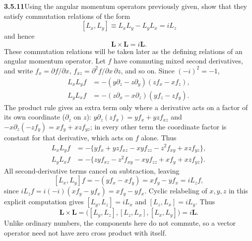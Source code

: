 \par\bigskip
\noindent\textbf{3.5.11}\quad Using the angular momentum operators previously
given, show that they satisfy commutation relations of the form
\[
[L_{x},L_{y}]\equiv L_{x}L_{y}-L_{y}L_{x}=iL_{z}
\]
and hence
\[
\mathbf{L}\times\mathbf{L}=i\mathbf{L}.
\]
These commutation relations will be taken later as the defining relations of
an angular momentum operator.
\solution
Let $f$ have commuting mixed second derivatives, and write
$f_x=\partial f/\partial x$, $f_{xz}=\partial^2f/\partial x\,\partial z$,
and so on. Since $(-i)^2=-1$,
\[
\begin{aligned}
L_xL_yf&=-(y\partial_z-z\partial_y)(zf_x-xf_z),\\
L_yL_xf&=-(z\partial_x-x\partial_z)(yf_z-zf_y).
\end{aligned}
\]
The product rule gives an extra term only where a derivative acts on a
factor of its own coordinate ($\partial_z$ on $z$):
$y\partial_z(zf_x)=yf_x+yzf_{xz}$ and
$-x\partial_z(-zf_y)=xf_y+xzf_{yz}$; in every other term the coordinate
factor is constant for that derivative, which acts on $f$ alone. Thus
\[
\begin{aligned}
L_xL_yf&=-\{y f_x+yzf_{xz}-xyf_{zz}-z^2f_{xy}+xz f_{yz}\},\\
L_yL_xf&=-\{zyf_{xz}-z^2f_{xy}-xyf_{zz}+x f_y+xz f_{yz}\}.
\end{aligned}
\]
All second-derivative terms cancel on subtraction, leaving
\[
[L_x,L_y]f=-(yf_x-xf_y)=xf_y-yf_x=iL_zf,
\]
since $iL_zf=i(-i)(xf_y-yf_x)=xf_y-yf_x$.
Cyclic relabeling of $x,y,z$ in this explicit computation gives
$[L_y,L_z]=iL_x$ and $[L_z,L_x]=iL_y$.
Thus
\[
\mathbf L\times\mathbf L
=\bigl([L_y,L_z],[L_z,L_x],[L_x,L_y]\bigr)=\boxed{i\mathbf L}.
\]
Unlike ordinary numbers, the components here do not commute, so a
vector operator need not have zero cross product with itself.


